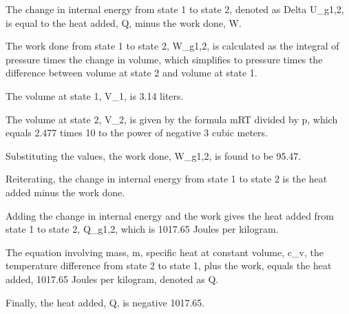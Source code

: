 The change in internal energy from state 1 to state 2, denoted as Delta U_g1,2, is equal to the heat added, Q, minus the work done, W.

The work done from state 1 to state 2, W_g1,2, is calculated as the integral of pressure times the change in volume, which simplifies to pressure times the difference between volume at state 2 and volume at state 1.

The volume at state 1, V_1, is 3.14 liters.

The volume at state 2, V_2, is given by the formula mRT divided by p, which equals 2.477 times 10 to the power of negative 3 cubic meters.

Substituting the values, the work done, W_g1,2, is found to be 95.47.

Reiterating, the change in internal energy from state 1 to state 2 is the heat added minus the work done.

Adding the change in internal energy and the work gives the heat added from state 1 to state 2, Q_g1,2, which is 1017.65 Joules per kilogram.

The equation involving mass, m, specific heat at constant volume, c_v, the temperature difference from state 2 to state 1, plus the work, equals the heat added, 1017.65 Joules per kilogram, denoted as Q.

Finally, the heat added, Q, is negative 1017.65.
